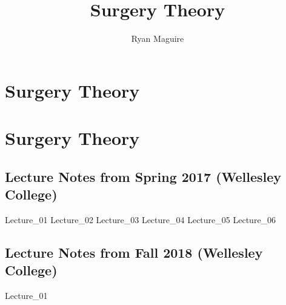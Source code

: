 \documentclass[crop=false,class=book,oneside]{standalone}
\begin{document}
    \newif\ifmathcoursessurgery
    \ifx\ifmathcourses\undefined
        \title{Surgery Theory}
        \author{Ryan Maguire}
        \date{\vspace{-5ex}}
        \maketitle
        \tableofcontents
        \listoffigures
        \clearpage
        \chapter*{Surgery Theory}
        \setcounter{chapter}{1}
    \else
        \chapter{Surgery Theory}
        
    \fi
    \section{Lecture Notes from Spring 2017 (Wellesley College)}
        {Lecture_01}
        {Lecture_02}
        {Lecture_03}
        {Lecture_04}
        {Lecture_05}
        {Lecture_06}
    \section{Lecture Notes from Fall 2018 (Wellesley College)}
        {Lecture_01}
\end{document}
